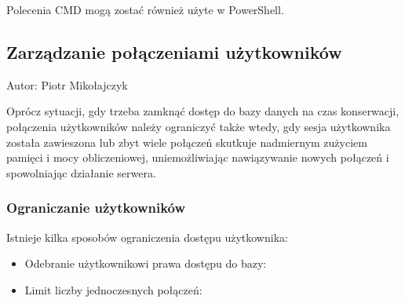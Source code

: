 \documentclass[letterpaper,10pt,polish]{sphinxmanual}
\begin{document}
\sphinxAtStartPar
Polecenia CMD mogą zostać również użyte w PowerShell.


\subsection{Zarządzanie połączeniami użytkowników}
\label{\detokenize{rozdzial2/Kontrola_i_konserwacja/kontrola_i_konserwacja:zarzadzanie-polaczeniami-uzytkownikow}}
\sphinxAtStartPar
Autor: Piotr Mikołajczyk

\sphinxAtStartPar
Oprócz sytuacji, gdy trzeba zamknąć dostęp do bazy danych na czas konserwacji, połączenia użytkowników należy ograniczyć także wtedy, gdy sesja użytkownika została zawieszona lub zbyt wiele połączeń skutkuje nadmiernym zużyciem pamięci i mocy obliczeniowej, uniemożliwiając nawiązywanie nowych połączeń i spowolniając działanie serwera.


\subsubsection{Ograniczanie użytkowników}
\label{\detokenize{rozdzial2/Kontrola_i_konserwacja/kontrola_i_konserwacja:ograniczanie-uzytkownikow}}
\sphinxAtStartPar
Istnieje kilka sposobów ograniczenia dostępu użytkownika:
\begin{itemize}
\item {} 
\sphinxAtStartPar
Odebranie użytkownikowi prawa dostępu do bazy:
\begin{quote}

\begin{sphinxVerbatim}[commandchars=\\\{\}]
\end{sphinxVerbatim}
\end{quote}

\item {} 
\sphinxAtStartPar
Limit liczby jednoczesnych połączeń:
\begin{quote}

\begin{sphinxVerbatim}[commandchars=\\\{\}]
\end{sphinxVerbatim}
\end{quote}

\end{itemize}
\end{document}
